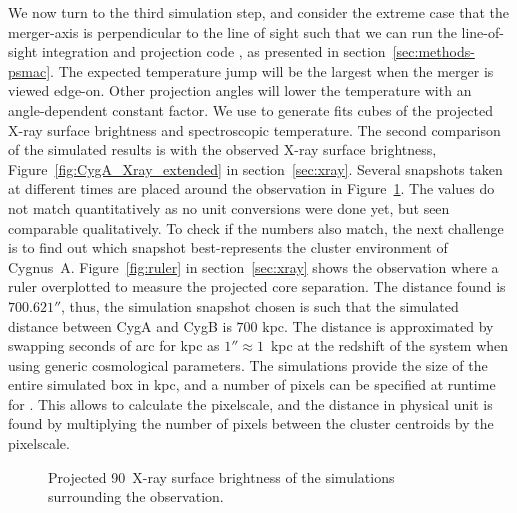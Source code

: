 \documentclass[MScProj_TLRH_ClusterEnergy.tex]{subfiles}
\begin{document}
We now turn to the third simulation step, and consider the extreme case that the 
merger-axis is perpendicular to the line of sight such that we can run the 
line-of-sight integration and projection code  
\citep{2014MNRAS.443.3564D}, as presented in section~\ref{sec:methods-psmac}.
The expected temperature jump will be the largest when the merger is viewed edge-on. 
Other projection angles will lower the temperature with an angle-dependent 
constant factor. We use  to generate fits cubes of the projected 
X-ray surface brightness and spectroscopic temperature. The second comparison
of the simulated results is with the observed  X-ray surface 
brightness, Figure~\ref{fig:CygA_Xray_extended} in section~\ref{sec:xray}. 
Several snapshots taken at different times are placed around the observation 
in Figure~\ref{fig:snapz}. The values do not match quantitatively as no
unit conversions were done yet, but seen comparable qualitatively.
To check if the numbers also match, the next challenge is to find 
out which snapshot best-represents the cluster environment of Cygnus~A. 
Figure~\ref{fig:ruler} in section~\ref{sec:xray} shows the  
observation where a ruler overplotted to measure the projected core separation. 
The distance found is $700.621''$, thus, the simulation snapshot chosen is such
that the simulated distance between CygA and CygB is $700$ kpc. The distance is
approximated by swapping seconds of arc for kpc as $1'' \approx 1$~kpc at the 
redshift of the system when using generic cosmological parameters. The 
simulations provide the size of the entire simulated box in kpc, and a number of 
pixels can be specified at runtime for . This allows to calculate 
the pixelscale, and the distance in physical unit is found by multiplying the 
number of pixels between the cluster centroids by the pixelscale. 


\begin{figure}
    \caption{Projected 90\deg \, X-ray surface brightness of the simulations
             surrounding the  observation.}
    \label{fig:snapz}
\end{figure}

\end{document}

